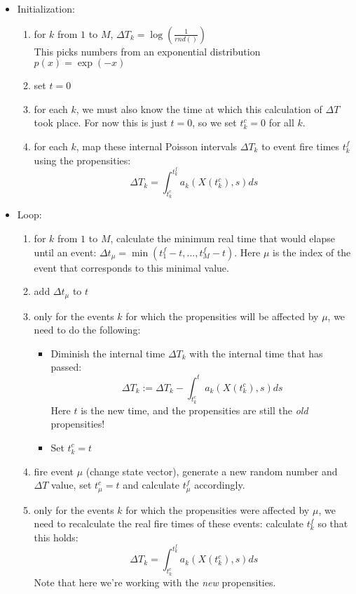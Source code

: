 \documentclass[a4paper,11pt]{article}
\begin{document}
		\begin{itemize}
			\item Initialization: 
			\begin{enumerate}
				\item for $k$ from $1$ to $M$, $\Delta T_k = \log\left(\frac{1}{rnd()}\right)$ \\
					This picks numbers from an exponential distribution $p(x) = \exp(-x)$
				\item set $t = 0$ 
				\item for each $k$, we must also know the time at which this calculation of
					$\Delta T$ took place. For now this is just $t = 0$, so we set $t^c_k = 0$ for
					all $k$.
				\item for each $k$, map these internal Poisson intervals $\Delta T_k$ to event fire times
					$t^f_k$ using the propensities: 
					\[ \Delta T_k = \int_{t^c_k}^{t^f_k} a_k(X(t^c_k),s) ds \]

			\end{enumerate}

			\item Loop:
			\begin{enumerate}
				\item for $k$ from $1$ to $M$, calculate the minimum real time that would elapse
					until an event: $\Delta t_\mu = \min(t^f_1 - t, ... , t^f_M - t)$. Here $\mu$
					is the index of the event that corresponds to this minimal value.
				\item add $\Delta t_\mu$ to $t$

				\item only for the events $k$ for which the propensities will be affected by $\mu$, we need to do
					the following:
					\begin{itemize}
						\item Diminish the internal time $\Delta T_k$ with the internal time that has passed: 
							\[ \Delta T_k := \Delta T_k - \int_{t^c_k}^{t} a_k(X(t^c_k),s) ds \]
							Here $t$ is the new
							time, and the propensities are still the {\em old} propensities!
						\item Set $t^c_k = t$
					\end{itemize}

				\item fire event $\mu$ (change state vector), generate a new random number and $\Delta T$ value, set
					$t^c_\mu = t$ and calculate $t^f_\mu$ accordingly.

				\item only for the events $k$ for which the propensities were affected by $\mu$, we need to recalculate
					the real fire times of these events: calculate $t^f_k$ so that this holds:
					\[\Delta T_k = \int_{t^c_k}^{t^f_k} a_k(X(t^c_k),s) ds \]
					Note that here we're working with the {\em new} propensities.

			\end{enumerate}
		\end{itemize}
\end{document}
